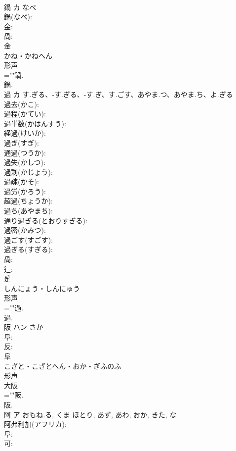\documentclass[8pt]{extreport}
\begin{document}
\begin{CJK}{UTF8}{min}
\\	鍋	カ	なべ		
\\	鍋(なべ): 
\\	金: 
\\	咼: 
\\	金	
\\	かね・かねへん	
\\	形声 
\\	=""鍋.
\\	鍋.
\\	過	カ	す.ぎる、-す.ぎる、-す.ぎ、す.ごす、あやま.つ、あやま.ち、よ.ぎる		
\\	過去(かこ): 
\\	過程(かてい): 
\\	過半数(かはんすう): 
\\	経過(けいか): 
\\	過ぎ(すぎ): 
\\	通過(つうか): 
\\	過失(かしつ): 
\\	過剰(かじょう): 
\\	過疎(かそ): 
\\	過労(かろう): 
\\	超過(ちょうか): 
\\	過ち(あやまち): 
\\	通り過ぎる(とおりすぎる): 
\\	過密(かみつ): 
\\	過ごす(すごす): 
\\	過ぎる(すぎる): 
\\	咼: 
\\	辶: 
\\	辵	
\\	しんにょう・しんにゅう	
\\	形声 
\\	=""過.
\\	過.
\\	阪	ハン	さか		
\\	阜: 
\\	反: 
\\	阜	
\\	こざと・こざとへん・おか・ぎふのふ	
\\	形声 
\\	大阪 
\\	=""阪.
\\	阪.
\\	阿	ア	おもね.る, くま	ほとり, あず, あわ, おか, きた, な	
\\	阿弗利加(アフリカ): 
\\	阜: 
\\	可: 

\end{CJK}
\end{document}
